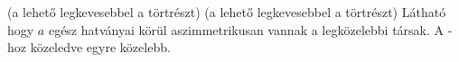 (a lehető legkevesebbel  a törtrészt)
(a lehető legkevesebbel  a törtrészt)
Látható hogy $a$ egész hatványai körül aszimmetrikusan vannak a 
legközelebbi társak. A -hoz közeledve egyre közelebb.